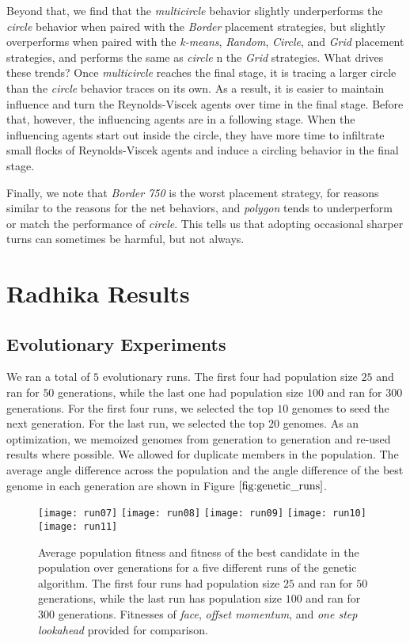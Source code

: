 Beyond that, we find that the \textit{multicircle} behavior slightly
underperforms the \textit{circle} behavior when paired with the
\textit{Border} placement strategies, but slightly overperforms when paired
with the  \textit{k-means}, \textit{Random}, \textit{Circle}, and
\textit{Grid} placement strategies, and performs the same as \textit{circle}
n the \textit{Grid} strategies.
What drives these trends?
Once \textit{multicircle} reaches the final stage, it is tracing a larger
circle than the \textit{circle} behavior traces on its own.
As a result, it is easier to maintain influence and turn the Reynolds-Viscek agents
over time in the final stage.
Before that, however, the influencing agents are in a following stage.
When the influencing agents start out inside the circle, they have more time to
infiltrate small flocks of Reynolds-Viscek agents and induce a circling behavior in
the final stage.

Finally, we note that \textit{Border 750} is the worst placement strategy,
for reasons similar to the reasons for the net behaviors, and \textit{polygon}
tends to underperform or match the performance of \textit{circle}.
This tells us that adopting occasional sharper turns can sometimes be harmful,
but not always.

\section{Radhika Results}
\subsection{Evolutionary Experiments}
We ran a total of $5$ evolutionary runs.
The first four had population size $25$ and ran for $50$ generations, while the
last one had population size $100$ and ran for $300$ generations.
For the first four runs, we selected the top $10$ genomes to seed the next
generation.
For the last run, we selected the top $20$ genomes.
As an optimization, we memoized genomes from generation to generation and re-used
results where possible.
We allowed for duplicate members in the population.
The average angle difference across the population and the angle difference of the
best genome in each generation are shown in Figure $\ref{fig:genetic_runs}$.
\begin{figure}
    \centering
    \texttt{[image: run07]}
    \texttt{[image: run08]}
    \texttt{[image: run09]}
    \texttt{[image: run10]}
    \texttt{[image: run11]}
    \caption{Average population fitness and fitness of the best candidate in the
    population over generations for a five different runs of the genetic algorithm.
    The first four runs had population size $25$ and ran for $50$ generations,
    while the last run has population size $100$ and ran for $300$ generations.
    Fitnesses of \textit{face}, \textit{offset momentum}, and \textit{one step
    lookahead} provided for comparison.}
    \label{fig:genetic_runs}
\end{figure}

